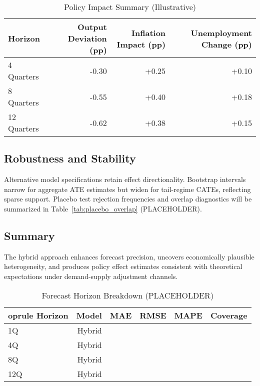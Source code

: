 \begin{table}[H]
  \centering
  \caption{Policy Impact Summary (Illustrative)}\label{tab:policy_impact_summary}
  \begin{tabular}{lrrr}
    \toprule
    Horizon & Output Deviation (pp) & Inflation Impact (pp) & Unemployment Change (pp) \\
    \midrule
    4 Quarters & -0.30 & +0.25 & +0.10 \\
    8 Quarters & -0.55 & +0.40 & +0.18 \\
    12 Quarters & -0.62 & +0.38 & +0.15 \\
    \bottomrule
  \end{tabular}
\end{table}

\subsection{Robustness and Stability}
Alternative model specifications retain effect directionality. Bootstrap intervals narrow for aggregate ATE estimates but widen for tail-regime CATEs, reflecting sparse support. Placebo test rejection frequencies and overlap diagnostics will be summarized in Table~\ref{tab:placebo_overlap} (PLACEHOLDER).

\subsection{Summary}
The hybrid approach enhances forecast precision, uncovers economically plausible heterogeneity, and produces policy effect estimates consistent with theoretical expectations under demand-supply adjustment channels.

\begin{table}[H]
  \centering
  \caption{Forecast Horizon Breakdown (PLACEHOLDER)}\label{tab:forecast_horizon_breakdown}
  \begin{tabular}{lrrrrr}
    	oprule
    Horizon & Model & MAE & RMSE & MAPE & Coverage \\
    \midrule
  1Q & Hybrid & \textemdash{} & \textemdash{} & \textemdash{} & \textemdash{} \\
  4Q & Hybrid & \textemdash{} & \textemdash{} & \textemdash{} & \textemdash{} \\
  8Q & Hybrid & \textemdash{} & \textemdash{} & \textemdash{} & \textemdash{} \\
  12Q & Hybrid & \textemdash{} & \textemdash{} & \textemdash{} & \textemdash{} \\
    \bottomrule
  \end{tabular}
\end{table}

